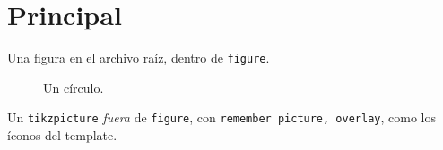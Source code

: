 \documentclass[11pt]{article}
\begin{document}
\section{Principal}

Una figura en el archivo raíz, dentro de \texttt{figure}.

\begin{figure}[ht]
  \centering
  \caption{Un círculo.}
\end{figure}




Un \texttt{tikzpicture} \emph{fuera} de \texttt{figure}, con \texttt{remember picture, overlay}, como los íconos del template.

\end{document}
